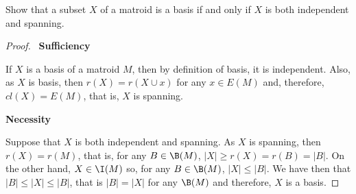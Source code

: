 \prob
{
    Show that a subset $X$ of a matroid is a basis if and only if $X$ is both independent and spanning.
}
\begin{proof}
    $\,$\pn
    \textbf{Sufficiency}\pn

    If $X$ is a basis of a matroid $M$, then by definition of basis, it is independent. Also, as $X$ is
    basis, then $r(X) = r(X \cup x)$ for any $x \in E(M)$ and, therefore, $cl(X) = E(M)$, that is, $X$ is spanning.\pn
    
    \textbf{Necessity}\pn
    
    Suppose that $X$ is both independent and spanning. As $X$ is spanning, then $r(X) = r(M)$, that is, for any $B \in \B(M)$,  
    $|X| \geq r(X) = r(B) = |B|$. On the other hand, $X \in \I(M)$ so, for any $B \in \B(M)$, $|X| \leq |B|$. We have then that
    $|B| \leq |X| \leq |B|$, that is $|B| = |X|$ for any $\B(M)$ and therefore, $X$ is a basis.    
\end{proof}